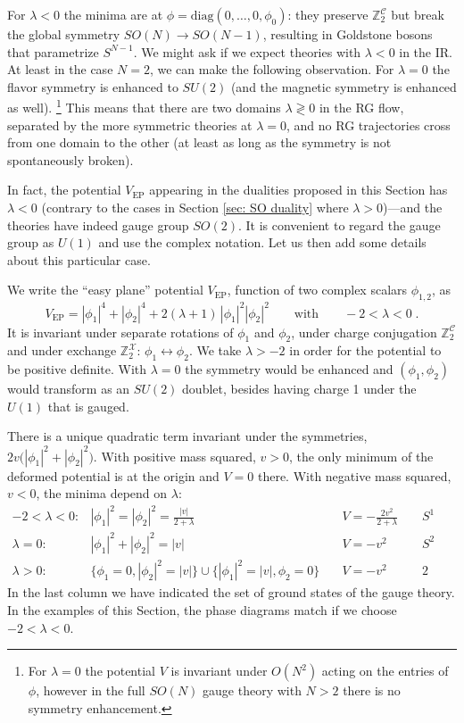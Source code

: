 \documentclass[a4paper, 12pt]{article}
\numberwithin{equation}{section}
\newcommand{\be}{\begin{equation}} \newcommand{\ee}{\end{equation}}
\newcommand{\cC}{\mathcal{C}}
\newcommand{\cX}{\mathcal{X}}
\newcommand{\bZ}{\mathbb{Z}}
\begin{document}
For $\lambda<0$ the minima are at $\phi = \text{diag}(0,\dots,0, \phi_0)$: they preserve $\bZ_2^\cC$ but break the global symmetry $SO(N) \to SO(N-1)$, resulting in Goldstone bosons that parametrize $S^{N-1}$. We might ask if we expect theories with $\lambda<0$ in the IR. At least in the case $N=2$, we can make the following observation. For $\lambda = 0$ the flavor symmetry is enhanced to $SU(2)$ (and the magnetic symmetry is enhanced as well).%
\footnote{For $\lambda=0$ the potential $V$ is invariant under $O(N^2)$ acting on the entries of $\phi$, however in the full $SO(N)$ gauge theory with $N>2$ there is no symmetry enhancement.}
This means that there are two domains $\lambda \gtrless 0$ in the RG flow, separated by the more symmetric theories at $\lambda=0$, and no RG trajectories cross from one domain to the other (at least as long as the symmetry is not spontaneously broken).

In fact, the potential $V_\text{EP}$ appearing in the dualities proposed in this Section has $\lambda<0$ (contrary to the cases in Section \ref{sec: SO duality} where $\lambda>0$)---and the theories have indeed gauge group $SO(2)$. It is convenient to regard the gauge group as $U(1)$ and use the complex notation. Let us then add some details about this particular case.

We write the ``easy plane'' potential $V_\text{EP}$, function of two complex scalars $\phi_{1,2}$, as
\be
\label{V_EP}
V_\text{EP} = |\phi_1|^4 + |\phi_2|^4 + 2(\lambda+1)\, |\phi_1|^2 |\phi_2|^2 \qquad\text{with}\qquad -2 < \lambda < 0 \;.
\ee
It is invariant under separate rotations of $\phi_1$ and $\phi_2$, under charge conjugation $\bZ_2^\cC$ and under exchange $\bZ_2^\cX$: $\phi_1 \leftrightarrow \phi_2$. We take $\lambda>-2$ in order for the potential to be positive definite. With $\lambda=0$ the symmetry would be enhanced and $(\phi_1, \phi_2)$ would transform as an $SU(2)$ doublet, besides having charge 1 under the $U(1)$ that is gauged.

There is a unique quadratic term invariant under the symmetries, $2v \big( |\phi_1|^2 + |\phi_2|^2\big)$. With positive mass squared, $v>0$, the only minimum of the deformed potential is at the origin and $V=0$ there. With negative mass squared, $v<0$, the minima depend on $\lambda$:
$$
\begin{array}{rlll}
-2<\lambda<0: & |\phi_1|^2 = |\phi_2|^2 = \frac{|v|}{2+\lambda} & V = - \frac{2v^2}{2+\lambda} & S^1 \\[.3em]
\lambda =0: & |\phi_1|^2 + |\phi_2|^2 = |v| & V = - v^2 & S^2 \\[.3em]
\lambda > 0: & \{ \phi_1=0, |\phi_2|^2 = |v| \} \cup \{ |\phi_1|^2 = |v|, \phi_2 = 0\} \quad & V = - v^2 \qquad & \text{2 vacua}
\end{array}
$$
In the last column we have indicated the set of ground states of the gauge theory. In the examples of this Section, the phase diagrams match if we choose $-2< \lambda<0$.
\end{document}
